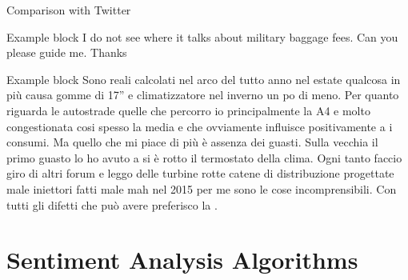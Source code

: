 \documentclass{beamer}
\begin{document}

	
	
	\begin{frame}{Comparison with Twitter}
		
		\begin{exampleblock}{Example block}
			 I do not see where it talks about military baggage fees. Can you please guide me. Thanks 
		\end{exampleblock}
		
		\begin{exampleblock}{Example block}
			{\scriptsize
				Sono reali calcolati nel arco del tutto anno nel estate qualcosa in più causa
				gomme di 17” e climatizzatore nel inverno un po di meno. Per quanto
				riguarda le autostrade quelle che percorro io principalmente la A4 e molto
				congestionata cosi spesso la media e  che ovviamente influisce
				positivamente a i consumi. Ma quello che mi piace di più è assenza dei
				guasti. Sulla vecchia  il primo guasto lo ho avuto a  si è
				rotto il termostato della clima. Ogni tanto faccio giro di altri forum e leggo
				delle turbine rotte catene di distribuzione progettate male iniettori fatti male
				mah nel 2015 per me sono le cose incomprensibili. Con tutti gli difetti che
				può avere preferisco la .}
		\end{exampleblock}
		
	\end{frame}




	\section{Sentiment Analysis Algorithms}
	
\end{document}
